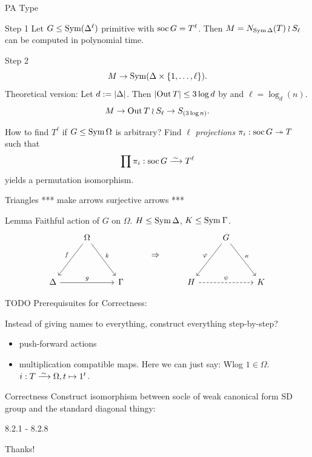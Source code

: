 \documentclass{beamer}
\theoremstyle{plain}
\theoremstyle{definition}
\newcommand{\todo}[1]{{\color{red}*** #1 ***}}
\begin{document}
\begin{frame}{PA Type}
\begin{block}{Step 1}
Let $G \leq \operatorname{Sym}(\Delta ^ \ell)$ primitive with
$\operatorname{soc} G = T ^ \ell$.
Then $M = N_{\operatorname{Sym} \Delta}(T) \wr S_\ell$ can be computed in polynomial
time.
\end{block}
\vspace{1em}

\pause
\begin{block}{Step 2}
\vspace{-1em}
\[
    M \rightarrow \operatorname{Sym}( \Delta \times  \left\{ 1, \ldots, \ell \right\}  ).
\]
\pause
Theoretical version: Let $d :=  \left| \Delta \right| $.
Then $ \left| \operatorname{Out} T \right|  \leq 3 \log d$ by
\cite{guralnick-maroti-pyber:normalizers-primitive-groups}
and $\ell = \log_d(n)$.
\[
    M \rightarrow \operatorname{Out} T \wr S_\ell \rightarrow S_{(3 \log n)}.
\]
\end{block}
\end{frame}

\begin{frame}
How to find $T ^ \ell$ if $G \leq \operatorname{Sym} \Omega$ is arbitrary?
Find $\ell$ \emph{projections} $\pi_i : \operatorname{soc} G \twoheadrightarrow T$
such that
\[
\prod \pi_i : \soc G \iso T ^ \ell
\]
yields a permutation isomorphism.
\end{frame}

\begin{frame}{Triangles}
\todo{make arrows surjective arrows}
\begin{block}{Lemma}
Faithful action of $G$ on $\Omega$.
$H \leq \operatorname{Sym} \Delta$, $K \leq \sym \Gamma$.
\[
\begin{tikzcd}[ampersand replacement=\&]
    \&
    \Omega
        \ar[ld, "f"']
        \ar[rd, "k"]
    \&
    \&
    \raisebox{-2em}{$\Rightarrow$}
    \&
    \&
    G
        \ar[ld, "\phi"']
        \ar[rd, "\kappa"]
    \&
    \\
    \Delta
        \ar[rr, "g"]
    \&
    \&
    \Gamma
    \&
    \&
    H
        \ar[rr, dashrightarrow, "\psi"]
    \&
    \&
    K
\end{tikzcd}
\]
\end{block}
\end{frame}

\begin{frame}{TODO}
Prerequisuites for Correctness:

Instead of giving names to everything, construct everything step-by-step?
\begin{itemize}
\item push-forward actions
\item multiplication compatible maps. Here we can just say:
Wlog $1 \in \Omega$.
$i : T \iso \Omega, t \mapsto 1 ^ t$.
\end{itemize}
\end{frame}

\begin{frame}{Correctness}
Construct isomorphism between socle of weak canonical form SD group and the
standard diagonal thingy:

8.2.1 - 8.2.8
\end{frame}

\begin{frame}[standout]
Thanks!
\end{frame}

\printbibliography
\appendix
\end{document}
